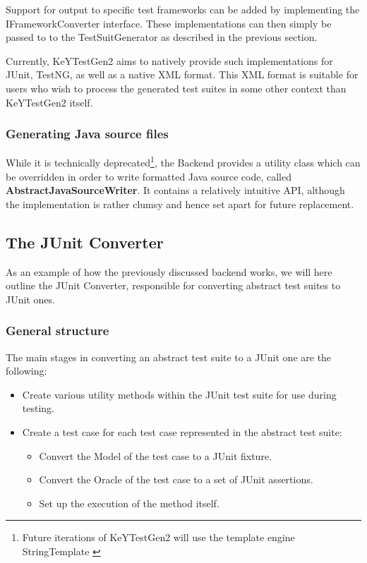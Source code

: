 \documentclass{article}
\newcommand{\tmstrong}[1]{\textbf{#1}}
\newenvironment{itemizedot}{\begin{itemize} \renewcommand{\labelitemi}{$\bullet$}\renewcommand{\labelitemii}{$\bullet$}\renewcommand{\labelitemiii}{$\bullet$}\renewcommand{\labelitemiv}{$\bullet$}}{\end{itemize}}
\newenvironment{itemizeminus}{\begin{itemize} \renewcommand{\labelitemi}{$-$}\renewcommand{\labelitemii}{$-$}\renewcommand{\labelitemiii}{$-$}\renewcommand{\labelitemiv}{$-$}}{\end{itemize}}
\begin{document}
Support for output to specific test frameworks can be added by implementing
the IFrameworkConverter interface. These implementations can then simply be
passed to to the TestSuitGenerator as described in the previous section.



Currently, KeYTestGen2 aims to natively provide such implementations for
JUnit, TestNG, as well as a native XML format. This XML format is suitable for
users who wish to process the generated test suites in some other context than
KeYTestGen2 itself.



\subsubsection{Generating Java source files}

While it is technically deprecated{\footnote{Future iterations of KeYTestGen2
will use the template engine StringTemplate {\cite{StringTemplateWebsite}}}},
the Backend provides a utility class which can be overridden in order to write
formatted Java source code, called {\tmstrong{AbstractJavaSourceWriter}}. It
contains a relatively intuitive API, although the implementation is rather
clumsy and hence set apart for future replacement.



\subsection{The JUnit Converter}

As an example of how the previously discussed backend works, we will here
outline the JUnit Converter, responsible for converting abstract test suites
to JUnit ones.

\subsubsection{General structure}

The main stages in converting an abstract test suite to a JUnit one are the
following:
\begin{itemizedot}
  \item Create various utility methods within the JUnit test suite for use
  during testing.
  
  \item Create a test case for each test case represented in the abstract test
  suite:
  \begin{itemizeminus}
    \item Convert the Model of the test case to a JUnit fixture.
    
    \item Convert the Oracle of the test case to a set of JUnit assertions.
    
    \item Set up the execution of the method itself. \ 
  \end{itemizeminus}
\end{itemizedot}
\end{document}
